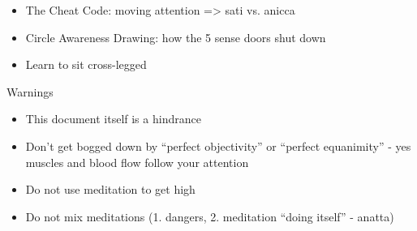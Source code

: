 \documentclass{article}
\begin{document}
\begin{itemize}
  \item The Cheat Code: moving attention => sati vs. anicca
  \item Circle Awareness Drawing: how the 5 sense doors shut down
  \item Learn to sit cross-legged
\end{itemize}

\pagebreak

\begin{center}
  \Huge{Warnings}
\end{center}

\begin{itemize}
  \item This document itself is a hindrance
  \item Don't get bogged down by ``perfect objectivity'' or ``perfect equanimity'' - yes muscles and blood flow follow your attention
  \item Do not use meditation to get high
  \item Do not mix meditations (1. dangers, 2. meditation ``doing itself'' - anatta)
\end{itemize}
\end{document}
